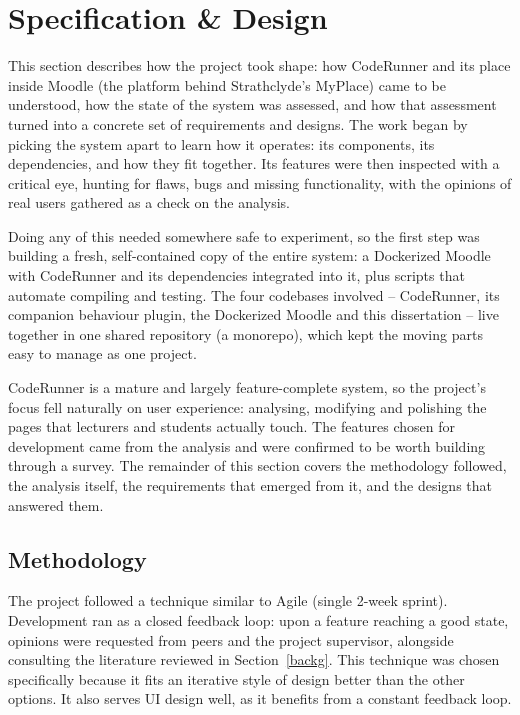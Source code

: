 
\section{Specification \& Design}\label{process}
This section describes how the project took shape: how CodeRunner and its place inside Moodle (the platform behind Strathclyde's MyPlace) came to be understood, how the state of the system was assessed, and how that assessment turned into a concrete set of requirements and designs. The work began by picking the system apart to learn how it operates: its components, its dependencies, and how they fit together. Its features were then inspected with a critical eye, hunting for flaws, bugs and missing functionality, with the opinions of real users gathered as a check on the analysis.

Doing any of this needed somewhere safe to experiment, so the first step was building a fresh, self-contained copy of the entire system: a Dockerized Moodle with CodeRunner and its dependencies integrated into it, plus scripts that automate compiling and testing. The four codebases involved -- CodeRunner, its companion behaviour plugin, the Dockerized Moodle and this dissertation -- live together in one shared repository (a monorepo), which kept the moving parts easy to manage as one project.

CodeRunner is a mature and largely feature-complete system, so the project's focus fell naturally on user experience: analysing, modifying and polishing the pages that lecturers and students actually touch. The features chosen for development came from the analysis and were confirmed to be worth building through a survey. The remainder of this section covers the methodology followed, the analysis itself, the requirements that emerged from it, and the designs that answered them.


\subsection{Methodology}
The project followed a technique similar to Agile (single 2-week sprint).
Development ran as a closed feedback loop: upon a feature reaching a good state, opinions were requested from peers and the project supervisor, alongside consulting the literature reviewed in Section~\ref{backg}.
This technique was chosen specifically because it fits an iterative style of design better than the other options. It also serves UI design well, as it benefits from a constant feedback loop.

